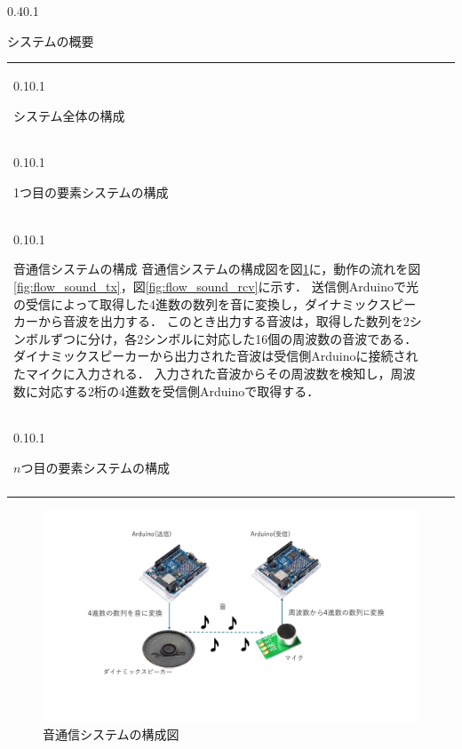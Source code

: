 \documentclass[a4j,11pt,dvipdfmx]{jsarticle}
\makeatletter
\renewcommand{\section}{%
    \@startsection{section}{1}{\z@}%
    {0.4\Cvs}{0.1\Cvs}%
    {\normalfont\headfont\raggedright}}
\renewcommand{\subsection}{%
    \@startsection{subsection}{1}{\z@}%
    {0.1\Cvs}{0.1\Cvs}%
    {\normalfont\headfont\raggedright}}
\newcommand{\bhline}{\noalign{\hrule height 1pt}}
\makeatother
\begin{document}
\section{システムの概要}\label{sec:about_system}
\begin{table}[H]
\vspace{-1em}
\centering
\begin{tabular}{bp{}b}
\bhline
\subsection{システム全体の構成}
	
	\\ \bhline
\subsection{1つ目の要素システムの構成}
	
	 \\ \bhline
\subsection{音通信システムの構成}
音通信システムの構成図を図\ref{fig:sound_composition}に，動作の流れを図\ref{fig:flow_sound_tx}，図\ref{fig:flow_sound_rcv}に示す．
送信側Arduinoで光の受信によって取得した4進数の数列を音に変換し，ダイナミックスピーカーから音波を出力する．
このとき出力する音波は，取得した数列を2シンボルずつに分け，各2シンボルに対応した16個の周波数の音波である．
ダイナミックスピーカーから出力された音波は受信側Arduinoに接続されたマイクに入力される．
入力された音波からその周波数を検知し，周波数に対応する2桁の4進数を受信側Arduinoで取得する．

	 \\ \bhline
\subsection{$n$つ目の要素システムの構成}
	
	 \\ \bhline
\end{tabular}
\end{table}

\begin{figure}[h]
    \centering
    \includegraphics[width=160mm]{../img/sound_composition.pdf}
    \caption{音通信システムの構成図}
    \label{fig:sound_composition}
\end{figure}
\end{document}
